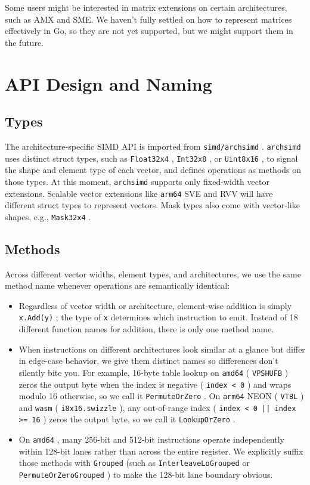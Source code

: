 \documentclass[11pt,a4paper]{article}
\begin{document}
Some users might be interested in matrix extensions on certain architectures, such as AMX and SME. We haven't fully settled on how to represent matrices effectively in Go, so they are not yet supported, but we might support them in the future.

\section{API Design and Naming}

\subsection{Types}

The architecture-specific SIMD API is imported from \texttt{simd/archsimd} . \texttt{archsimd} uses distinct struct types, such as \texttt{Float32x4} , \texttt{Int32x8} , or \texttt{Uint8x16} , to signal the shape and element type of each vector, and defines operations as methods on those types. At this moment, \texttt{archsimd} supports only fixed-width vector extensions. Scalable vector extensions like \texttt{arm64} SVE and RVV will have different struct types to represent vectors. Mask types also come with vector-like shapes, e.g., \texttt{Mask32x4} .

\subsection{Methods}

Across different vector widths, element types, and architectures, we use the same method name whenever operations are semantically identical:

\begin{itemize}
\item Regardless of vector width or architecture, element-wise addition is simply \texttt{x.Add(y)} ; the type of \texttt{x} determines which instruction to emit. Instead of 18 different function names for addition, there is only one method name.
\item When instructions on different architectures look similar at a glance but differ in edge-case behavior, we give them distinct names so differences don't silently bite you. For example, 16-byte table lookup on \texttt{amd64} ( \texttt{VPSHUFB} ) zeros the output byte when the index is negative ( \texttt{index < 0} ) and wraps modulo 16 otherwise, so we call it \texttt{PermuteOrZero} . On \texttt{arm64} NEON ( \texttt{VTBL} ) and \texttt{wasm} ( \texttt{i8x16.swizzle} ), any out-of-range index ( \texttt{index < 0 || index >= 16} ) zeros the output byte, so we call it \texttt{LookupOrZero} .
\item On \texttt{amd64} , many 256-bit and 512-bit instructions operate independently within 128-bit lanes rather than across the entire register. We explicitly suffix those methods with \texttt{Grouped} (such as \texttt{InterleaveLoGrouped} or \texttt{PermuteOrZeroGrouped} ) to make the 128-bit lane boundary obvious.
\end{itemize}
\end{document}
